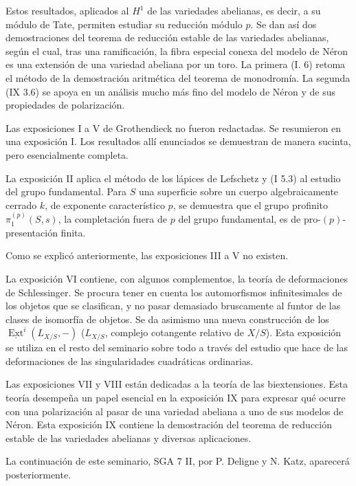Estos resultados, aplicados al $H^1$ de las variedades abelianas, es decir, a su módulo
de Tate, permiten estudiar su reducción módulo $p$. Se dan así dos
demostraciones del teorema de reducción estable de las variedades abelianas, según el cual,
tras una ramificación, la fibra especial conexa del modelo de Néron es una extensión de una
variedad abeliana por un toro. La primera (I. 6) retoma el método de la demostración
aritmética del teorema de monodromía. La segunda (IX 3.6) se apoya en un
análisis mucho más fino del modelo de Néron y de sus propiedades de polarización.

Las exposiciones I a V de Grothendieck no fueron redactadas. Se resumieron
en una exposición I. Los resultados allí enunciados se demuestran de manera sucinta, pero
esencialmente completa.

La exposición II aplica el método de los lápices de Lefschetz y (I 5.3) al
estudio del grupo fundamental. Para $S$ una superficie sobre un cuerpo algebraicamente cerrado
$k$, de exponente característico $p$, se demuestra que el grupo profinito $\pi_1^{(p)}(S,s)$, la completación
fuera de $p$ del grupo fundamental, es de pro-$(p)$-presentación finita.

Como se explicó anteriormente, las exposiciones III a V no existen.
\clearpage

La exposición VI contiene, con algunos complementos, la teoría de deformaciones
de Schlessinger. Se procura tener en cuenta los automorfismos infinitesimales
de los objetos que se clasifican, y no pasar demasiado bruscamente al funtor de las clases
de isomorfía de objetos. Se da asimismo una nueva construcción de los
$\underline{\operatorname{Ext}}^{i}(L_{X/S},-)$ ($L_{X/S}$, complejo cotangente relativo de $X/S$). Esta exposición se utiliza en el
resto del seminario sobre todo a través del estudio que hace de las deformaciones de las singularidades
cuadráticas ordinarias.

Las exposiciones VII y VIII están dedicadas a la teoría de las biextensiones. Esta
teoría desempeña un papel esencial en la exposición IX para expresar qué ocurre con una
polarización al pasar de una variedad abeliana a uno de sus modelos de Néron.
Esta exposición IX contiene la demostración del teorema de reducción estable de las variedades
abelianas y diversas aplicaciones.

La continuación de este seminario, SGA 7 II, por P. Deligne y N. Katz, aparecerá
posteriormente.

